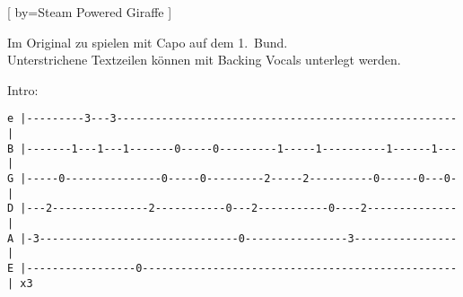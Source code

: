 [
	by={Steam Powered Giraffe}
]
%
\begin{infotext}
Im Original zu spielen mit Capo auf dem 1.~Bund.\\
Unterstrichene Textzeilen können mit Backing Vocals unterlegt werden.
\end{infotext}
\vspace*{-2em}
%
\beginverse*
Intro:
\begin{normalsize}
\begin{lstlisting}
e |---------3---3-----------------------------------------------------|
B |-------1---1---1-------0-----0---------1-----1----------1------1---|
G |-----0---------------0-----0---------2-----2----------0------0---0-|
D |---2---------------2-----------0---2-----------0----2--------------|
A |-3-------------------------------0----------------3----------------|
E |-----------------0-------------------------------------------------| x3  
\end{lstlisting}
\end{normalsize}
\endverse

